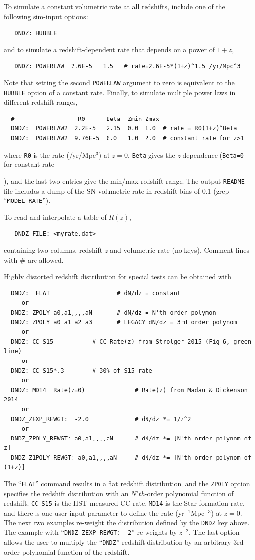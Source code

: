 \documentclass[12pt]{article}
\begin{document}
{To simulate a constant volumetric rate at all redshifts,
include one of the following sim-input options:
%
\begin{verbatim}
   DNDZ: HUBBLE
\end{verbatim}
%
and to simulate a redshift-dependent rate that depends
on a power of $1+z$,
%
\begin{verbatim}
   DNDZ: POWERLAW  2.6E-5   1.5   # rate=2.6E-5*(1+z)^1.5 /yr/Mpc^3
\end{verbatim}
%
Note that setting the second {\tt POWERLAW} argument to zero
is equivalent to the {\tt HUBBLE} option of a constant rate.
Finally, to simulate multiple power laws in different 
redshift ranges,
\begin{verbatim}
  #                  R0      Beta  Zmin Zmax
  DNDZ:  POWERLAW2  2.2E-5   2.15  0.0  1.0  # rate = R0(1+z)^Beta
  DNDZ:  POWERLAW2  9.76E-5  0.0   1.0  2.0  # constant rate for z>1
\end{verbatim}
%
where {\tt R0} is the rate (/yr/Mpc$^3$) at $z=0$,
{\tt Beta} gives the $z$-dependence ({\tt Beta=0} for constant rate}),
and the last two entries give the min/max redshift range.
The output {\tt README} file includes a dump of the 
SN volumetric rate in redshift bins of 0.1
(grep ``{\tt MODEL-RATE}'').

To read and interpolate a table of $R(z)$,
\begin{verbatim}     
   DNDZ_FILE: <myrate.dat>
\end{verbatim}
containing two columns, redshift $z$ and volumetric rate (no keys).
Comment lines with \# are allowed.


\bigskip
Highly distorted redshift distribution for special tests
can be obtained with
%
\begin{verbatim}
  DNDZ:  FLAT                   # dN/dz = constant
     or
  DNDZ: ZPOLY a0,a1,,,,aN       # dN/dz = N'th-order polymon
  DNDZ: ZPOLY a0 a1 a2 a3       # LEGACY dN/dz = 3rd order polynom
     or
  DNDZ: CC_S15           # CC-Rate(z) from Strolger 2015 (Fig 6, green line)
     or
  DNDZ: CC_S15*.3        # 30% of S15 rate
     or
  DNDZ: MD14  Rate(z=0)              # Rate(z) from Madau & Dickenson 2014  
     or
  DNDZ_ZEXP_REWGT:  -2.0             # dN/dz *= 1/z^2
     or
  DNDZ_ZPOLY_REWGT: a0,a1,,,,aN      # dN/dz *= [N'th order polynom of z]
  DNDZ_Z1POLY_REWGT: a0,a1,,,,aN     # dN/dz *= [N'th order polynom of (1+z)] 
\end{verbatim}
%
The ``{\tt FLAT}'' command results in a flat redshift distribution,
and the {\tt ZPOLY} option specifies the redshift distribution with
an $N'th$-order polynomial function of redshift.
{\tt CC\_S15} is the HST-measured CC rate.
{\tt MD14} is the Star-formation rate, and there is one user-input 
parameter to define the rate (yr$^{-1}$Mpc$^{-3}$) at $z=0$.
The next two examples re-weight the distribution defined
by the {\tt DNDZ} key above.
The example with ``{\tt DNDZ\_ZEXP\_REWGT: -2}'' re-weights
by $z^{-2}$.
The last option allows the user to multiply the ``{\tt DNDZ}''
redshift distribution by an arbitrary 3rd-order polynomial
function of the redshift.
\end{document}
